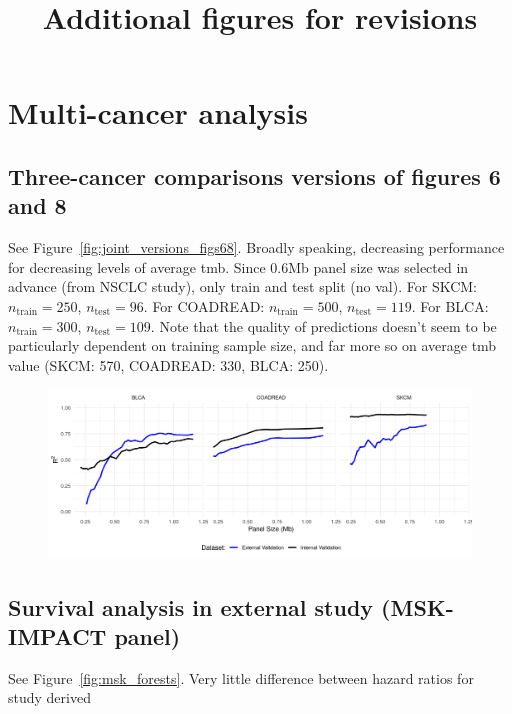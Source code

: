 \documentclass[12pt]{article}
\title{Additional figures for revisions}
\begin{document}
\section{Multi-cancer analysis}
\subsection{Three-cancer comparisons versions of figures 6 and 8}
See Figure~\ref{fig:joint_versions_figs68}. Broadly speaking, decreasing performance for decreasing levels of average \gls{tmb}. Since 0.6Mb panel size was selected in advance (from NSCLC study), only train and test split (no val). For SKCM: $n_{\text{train}} = 250$, $n_{\text{test}} = 96$. For COADREAD: $n_{\text{train}} = 500$, $n_{\text{test}} = 119$. For BLCA: $n_{\text{train}} = 300$, $n_{\text{test}} = 109$. Note that the quality of predictions doesn't seem to be particularly dependent on training sample size, and far more so on average \gls{tmb} value (SKCM: 570, COADREAD: 330, BLCA: 250). 
\begin{figure}[h]
    \centering
    \includegraphics[width=5in]{results/figures/external_validation_fig.png} 
    \caption{
    \label{fig:external_validation_fig}}
\end{figure}
\newpage
\subsection{Survival analysis in external study (MSK-IMPACT panel)}
See Figure~\ref{fig:msk_forests}. Very little difference between hazard ratios for study derived
\end{document}
